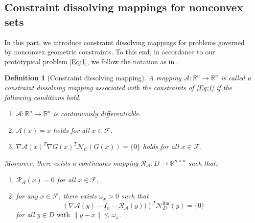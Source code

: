 \documentclass[11pt,a4paper,reqno]{amsart}
\newtheorem{definition}[theorem]{Definition}
\newtheorem{assumption}{Assumption}
\begin{document}
{\subsection{Constraint dissolving mappings for nonconvex sets}
 In this part, we introduce constraint dissolving mappings for problems governed by nonconvex geometric constraints. To this end, in accordance to our prototypical problem \eqref{Eq:1}, we follow the notation as in .


\begin{definition}[Constraint dissolving mapping]
    A mapping $\mathcal A :\mathbb R^n \to \mathbb R^n$ is called a \textit{constraint dissolving mapping} associated with the constraints of \eqref{Eq:1} if the following conditions hold.
    \begin{enumerate}[label=(\alph*)] \label{Ass:1}
    \item \label{item:a}$\mathcal A: \mathbb R^n \to \mathbb R^n$ is continuously differentiable. 
    \item \label{item:b} $\mathcal A(x)=x$ holds for all $x\in \mathcal F$.
    \item \label{item:c}$\nabla \mathcal A(x)^T \nabla G(x)^T \mathcal N_C (G(x))=\{0\}$ holds for all $x\in \mathcal F$.
\end{enumerate}
Moreover, there exists a %
    continuous mapping
$\mathcal R_{\mathcal A} : D\to \mathbb{R}^{n \times n}$
such that:
\begin{enumerate}[label=(\alph*),start=4]
    \item \label{item:d} \( \mathcal R_{\mathcal A}(x) = 0 \) for all \( x \in \mathcal F\),
   \item \label{item:e} for any \( x \in \mathcal F \), there exists \( \omega_x > 0 \) such that
    \[
    \left(\nabla \mathcal A(y) - I_n - \mathcal R_{\mathcal A}(y))\right)^T \mathcal N_D^{\text{lim}}(y) = \{0\}
    \]
   for all $ y \in D \text{ with } \|y - x\| \le \omega_x$.
   \end{enumerate}
\end{definition}


}
\end{document}
